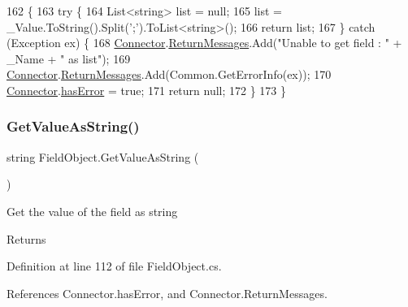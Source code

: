 \begin{DoxyCode}
162                                          \{
163         \textcolor{keywordflow}{try} \{
164             List<string> list = null;
165             list = \_Value.ToString().Split(\textcolor{charliteral}{';'}).ToList<\textcolor{keywordtype}{string}>();
166             \textcolor{keywordflow}{return} list;
167         \} \textcolor{keywordflow}{catch} (Exception ex) \{
168             \mbox{\hyperlink{class_connector}{Connector}}.\mbox{\hyperlink{class_connector_a1ed422674b344524fd77998dcf6a9ba6}{ReturnMessages}}.Add(\textcolor{stringliteral}{"Unable to get field : "} + \_Name + \textcolor{stringliteral}{" as
       list"});
169             \mbox{\hyperlink{class_connector}{Connector}}.\mbox{\hyperlink{class_connector_a1ed422674b344524fd77998dcf6a9ba6}{ReturnMessages}}.Add(Common.GetErrorInfo(ex));
170             \mbox{\hyperlink{class_connector}{Connector}}.\mbox{\hyperlink{class_connector_a079bae21a5417efa53bfe8954c0f533f}{hasError}} = \textcolor{keyword}{true};
171             \textcolor{keywordflow}{return} null;
172         \}
173      \}
\end{DoxyCode}
\mbox{\label{class_field_object_ad223b04d429de4b2c57838ffb41d124b}} 
\subsubsection{\texorpdfstring{Get\+Value\+As\+String()}{GetValueAsString()}}
{\footnotesize\ttfamily string Field\+Object.\+Get\+Value\+As\+String (\begin{DoxyParamCaption}{ }\end{DoxyParamCaption})}



Get the value of the field as string 

\begin{DoxyReturn}{Returns}

\end{DoxyReturn}


Definition at line 112 of file Field\+Object.\+cs.



References Connector.\+has\+Error, and Connector.\+Return\+Messages.


